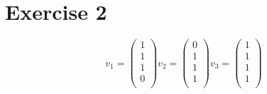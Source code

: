 \documentclass[a4paper]{article}
\begin{document}
\section*{Exercise 2}
\[
v_1 =
\left(
\begin{array}{c}
1 \\
1 \\
1 \\
0 \\
\end{array}
\right)
v_2 =
\left(
\begin{array}{c}
0 \\
1 \\
1 \\
1 \\
\end{array}
\right)
v_3 =
\left(
\begin{array}{c}
1 \\
1 \\
1 \\
1 \\
\end{array}
\right)
\]
\end{document}

